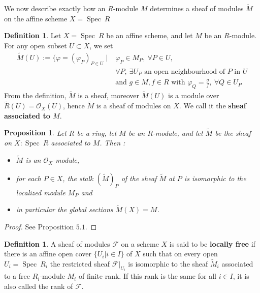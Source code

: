 \documentclass{article}
\theoremstyle{plain}
\newtheorem{proposition}[theorem]{Proposition}
\theoremstyle{definition}
\newtheorem{definition}[theorem]{Definition}
\DeclareMathOperator{\Spec}{Spec}
\begin{document}
\noindent We now describe exactly how an $R$-module $M$ determines a sheaf of modules $\widetilde{M}$ on the affine scheme $X=\Spec\:R$
\begin{definition}
    Let $X=\Spec\: R$ be an affine scheme, and let $M$ be an $R$-module.
    For any open subset $U\subset X$, we set
    \begin{equation*}
    \begin{split}
        \widetilde{M}(U) := \{\varphi = (\varphi_P)_{P\in U} \mid& \varphi_P \in M_P,\:\forall P\in U,\\
        &\forall P, \:\exists U_P \text{ an open neighbourhood of } P \text{ in } U\\
        &\text{and } g\in M, f\in R \text{ with } \varphi_Q = \frac{g}{f}, \:\forall Q\in U_P
    \end{split}
    \end{equation*}
    From the definition, $\widetilde{M}$ is a sheaf, moreover $\widetilde{M}(U)$ is a module over $\widetilde{R}(U) = \mathcal{O}_X(U)$, hence $\widetilde{M}$ is a sheaf of modules on $X$. We call it the \textbf{sheaf associated to $M$}. 
\end{definition}


\begin{proposition}
    Let $R$ be a ring, let $M$ be an $R$-module, and let $\widetilde{M}$ be the sheaf on $X : \Spec \: R$ associated to $M$. Then :
    \begin{itemize}
        \item[$a)$] $\widetilde{M}$ is an $\mathcal{O}_X$-module,
        \item[$b)$] for each $P\in X$, the stalk $(\widetilde{M})_P$ of the sheaf $\widetilde{M}$ at $P$ is isomorphic to the localized module $M_P$ and
        \item[$c)$] in particular the global sections $\widetilde{M}(X) = M$.
    \end{itemize}
\end{proposition}
\begin{proof}
    See \cite{Hartshorne} Proposition $5.1$.
\end{proof}


\begin{definition}
    A sheaf of modules $\mathcal{F}$ on a scheme $X$ is said to be \textbf{locally free} if there is an affine open cover $\{U_i |i\in I\}$ of $X$ such that on every open $U_i = \Spec\:R_i$ the restricted sheaf $\mathcal{F}\vert_{U_i}$ is isomorphic to the sheaf $\widetilde{M}_i$ associated to a free $R_i$-module $M_i$ of finite rank.
    If this rank is the same for all $i\in I$, it is also called the rank of $\mathcal{F}$.
\end{definition}
\end{document}
